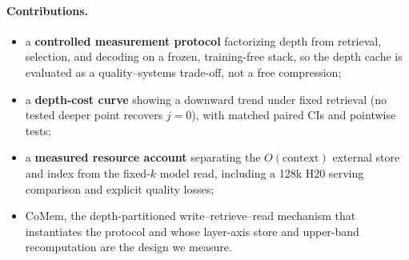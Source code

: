 \paragraph{Contributions.}
\begin{itemize}
    \item a \textbf{controlled measurement protocol} factorizing depth from
    retrieval, selection, and decoding on a frozen, training-free stack, so the
    depth cache is evaluated as a quality--systems trade-off, not a free
    compression;
    \item a \textbf{depth-cost curve} showing a downward trend under fixed
    retrieval (no tested deeper point recovers $j{=}0$), with matched paired CIs
    and pointwise tests;
    \item a \textbf{measured resource account} separating the $O(\text{context})$
    external store and index from the fixed-$k$ model read, including a 128k H20
    serving comparison and explicit quality losses;
    \item CoMem, the depth-partitioned write--retrieve--read mechanism that
    instantiates the protocol and whose layer-axis store and upper-band
    recomputation are the design we measure.
\end{itemize}
